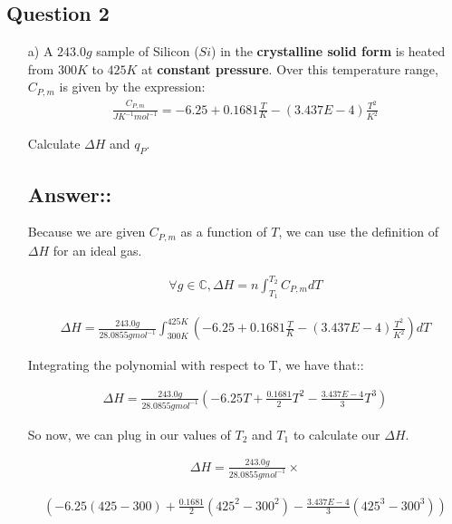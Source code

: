 \documentclass[12pt]{book}
\begin{document}
\subsection*{Question 2}

\begin{itemize}
    \item[a)] A $243.0g$ sample of Silicon ($Si$) in the \textbf{crystalline solid form} is heated from $300K$ to $425K$ at \textbf{constant pressure}. Over this temperature range, $C_{P,m}$ is given by the expression:
    \begin{align*}
        \frac{C_{P,m}}{JK^{-1}mol^{-1}}=-6.25+0.1681\frac{T}{K}-(3.437E-4)\frac{T^2}{K^2}
    \end{align*}

    Calculate $\Delta H$ and $q_P$.

    \subsection*{Answer::}

    Because we are given $C_{P,m}$ as a function of $T$, we can use the definition of $\Delta H$ for an ideal gas.

    \begin{align*}
        \forall g\in \mathbb{C}, \Delta H=n\int_{T_1}^{T_2}C_{P,m}dT
    \end{align*}

    \begin{align*}
        \Delta H=\frac{243.0g}{28.0855gmol^{-1}}\int_{300K}^{425K}\left(-6.25+0.1681\frac{T}{K}-(3.437E-4)\frac{T^2}{K^2}\right)dT
    \end{align*}

    Integrating the polynomial with respect to T, we have that::

    \begin{align*}
        \Delta H=\frac{243.0g}{28.0855gmol^{-1}}\left(-6.25T+\frac{0.1681}{2}T^2-\frac{3.437E-4}{3}T^3\right)
    \end{align*}
    
    So now, we can plug in our values of $T_2$ and $T_1$ to calculate our $\Delta H$.

    \begin{align*}
        \Delta H=\frac{243.0g}{28.0855gmol^{-1}}\times
    \end{align*}

    \begin{align*}
        \left(-6.25(425-300)+\frac{0.1681}{2}(425^2-300^2)-\frac{3.437E-4}{3}(425^3-300^3)\right)
    \end{align*}
    

\end{itemize}
\end{document}
